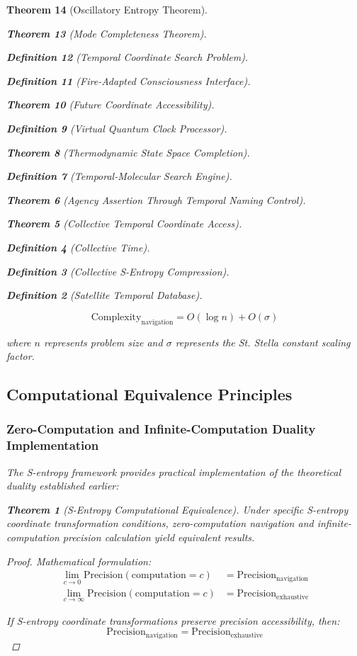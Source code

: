 \documentclass[12pt,a4paper]{article}
\newtheorem{theorem}{Theorem}[section]
\newtheorem{definition}[theorem]{Definition}
\begin{document}
\begin{theorem}[Oscillatory Entropy Theorem]
\begin{theorem}[Mode Completeness Theorem]
\begin{enumerate}
\begin{definition}[Temporal Coordinate Search Problem]
\begin{algorithm}
\begin{definition}[Fire-Adapted Consciousness Interface]
\begin{theorem}[Future Coordinate Accessibility]
\begin{definition}[Virtual Quantum Clock Processor]
\begin{itemize}
\begin{itemize}
\begin{theorem}[Thermodynamic State Space Completion]
\begin{definition}[Temporal-Molecular Search Engine]
\begin{theorem}[Agency Assertion Through Temporal Naming Control]
\begin{remark}
\begin{theorem}[Collective Temporal Coordinate Access]
\begin{definition}[Collective Time]
\begin{definition}[Collective S-Entropy Compression]
\begin{definition}[Satellite Temporal Database]
\begin{algorithm}
\begin{table}[h]
{{\begin{equation}
\text{Complexity}_{\text{navigation}} = O(\log n) + O(\sigma)
\label{eq:navigation_complexity}
\end{equation}

where $n$ represents problem size and $\sigma$ represents the St. Stella constant scaling factor.

\subsection{Computational Equivalence Principles}

\subsubsection{Zero-Computation and Infinite-Computation Duality Implementation}

The S-entropy framework provides practical implementation of the theoretical duality established earlier:

\begin{theorem}[S-Entropy Computational Equivalence]
Under specific S-entropy coordinate transformation conditions, zero-computation navigation and infinite-computation precision calculation yield equivalent results.
\end{theorem}

\begin{proof}
Mathematical formulation:
\begin{align}
\lim_{c \to 0} \text{Precision}(\text{computation} = c) &= \text{Precision}_{\text{navigation}} \\
\lim_{c \to \infty} \text{Precision}(\text{computation} = c) &= \text{Precision}_{\text{exhaustive}}
\end{align}

If S-entropy coordinate transformations preserve precision accessibility, then:
\begin{equation}
\text{Precision}_{\text{navigation}} = \text{Precision}_{\text{exhaustive}}
\end{equation}
\end{proof}

}}
\end{table}
\end{algorithm}
\end{definition}
\end{definition}
\end{definition}
\end{theorem}
\end{remark}
\end{theorem}
\end{definition}
\end{theorem}
\end{itemize}
\end{itemize}
\end{definition}
\end{theorem}
\end{definition}
\end{algorithm}
\end{definition}
\end{enumerate}
\end{theorem}
\end{theorem}
\end{document}
